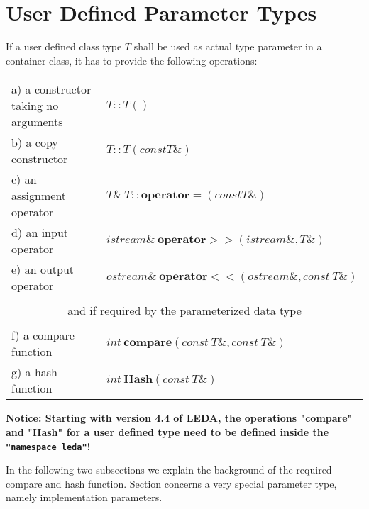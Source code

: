 \section{User Defined Parameter Types} 
\label{User Defined Parameter Types}

If a user defined class type $T$ shall be used as actual type parameter
in a container class, it has to provide the following operations:

\begin{tabular}{ll}
a) a constructor taking no arguments & $T::T()$ \\
b) a copy constructor                & $T::T(\mathit{const} T\&)$ \\
c) an assignment operator            & 
     $T\&\ T::\mathbf{operator}=(\mathit{const} T\&)$ \\
d) an input operator  & 
     $\mathit{istream}\&\ \mathbf{operator}>>(\mathit{istream}\&,T\&)$ \\
e) an output operator &
     $\mathit{ostream}\&\ \mathbf{operator}<<(\mathit{ostream}\&, 
      \mathit{const}\ T\&)$\\
\\
\multicolumn{2}{c}{and if required by the parameterized data type}\\
\\
f) a compare function &
     $\mathit{int}\ \mathbf{compare}(\mathit{const}\ T\&, \mathit{const}\ T\&)$\\
g) a hash function &
     $\mathit{int}\ \mathbf{Hash}(\mathit{const}\ T\&)$\\
\end{tabular}

\bigskip\noindent
{\bf Notice: Starting with version 4.4 of LEDA, the operations 
"compare" and "Hash" for a user defined type need to be defined
inside the \texttt{"namespace leda"}!}

\bigskip\noindent
In the following two subsections we explain the background of the required
compare and hash function. Section  concerns a very
special parameter type, namely implementation parameters.


